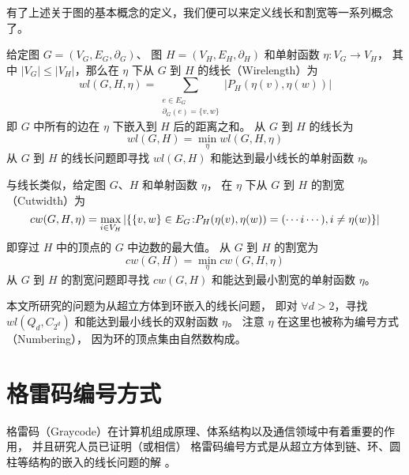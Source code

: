 有了上述关于图的基本概念的定义，我们便可以来定义线长和割宽等一系列概念了。

给定图 $G = (V_G, E_G, \partial_G)$、
图 $H = (V_H, E_H, \partial_H)$ 和单射函数 $\eta \colon V_G \rightarrow V_H$，
其中 $|V_G| \le |V_H|$，那么在 $\eta$ 下从 $G$ 到 $H$ 的线长（Wirelength）为
\begin{equation*}
wl(G, H, \eta) = \sum_{\substack{
	e \in E_G \\
	\partial_G(e) = \{v, w\}
}} |P_H(\eta(v), \eta(w))|
\end{equation*}
即 $G$ 中所有的边在 $\eta$ 下嵌入到 $H$ 后的距离之和。
从 $G$ 到 $H$ 的线长为
\begin{equation*}
wl(G, H) = \min_{\eta} wl(G, H, \eta)
\end{equation*}
从 $G$ 到 $H$ 的线长问题即寻找 $wl(G, H)$ 和能达到最小线长的单射函数 $\eta$。

与线长类似，给定图 $G$、$H$ 和单射函数 $\eta$，
在 $\eta$ 下从 $G$ 到 $H$ 的割宽（Cutwidth）为
\begin{equation*}
cw(G, H, \eta) = \max_{i \in V_H} |\{\{v, w\} \in E_G \colon \\
P_H(\eta(v), \eta(w)) = (\cdots i \cdots), i \neq \eta(w)\}|
\end{equation*}
即穿过 $H$ 中的顶点的 $G$ 中边数的最大值。
从 $G$ 到 $H$ 的割宽为
\begin{equation*}
cw(G, H) = \min_{\eta} cw(G, H, \eta)
\end{equation*}
从 $G$ 到 $H$ 的割宽问题即寻找 $cw(G, H)$ 和能达到最小割宽的单射函数 $\eta$。

本文所研究的问题为从超立方体到环嵌入的线长问题，
即对 $\forall d > 2$，寻找 $wl(Q_d, C_{2^d})$ 和能达到最小线长的双射函数 $\eta$。
注意 $\eta$ 在这里也被称为编号方式（Numbering），
因为环的顶点集由自然数构成。

\section{格雷码编号方式}
\label{Section 2.3}

格雷码（Graycode）在计算机组成原理、体系结构以及通信领域中有着重要的作用，
并且研究人员已证明（或相信）
格雷码编号方式是从超立方体到链、环、圆柱等结构的嵌入的线长问题的解
\cite{Harper.1964,Guu.1997,Manuel.2011}。

